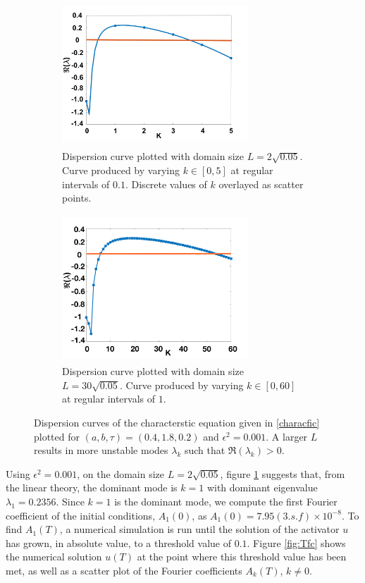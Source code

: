 \begin{figure}[H]
    \centering
    \begin{subfigure}[b]{0.45\textwidth}
        \centering
        \includegraphics[width=7cm,height=5.5cm]{compdisp1.png}
        \caption{Dispersion curve plotted with domain size $L=2\sqrt{0.05}$. Curve produced by varying $k\in[0,5]$ at regular intervals of $0.1$. Discrete values of $k$ overlayed as scatter points. }
        \label{fig:compdisp1}
    \end{subfigure}
    \hfill
    \begin{subfigure}[b]{0.45\textwidth}
        \centering
        \includegraphics[width=7cm,height=5.5cm]{compdisp2.png}
        \caption{Dispersion curve plotted with domain size $L=30\sqrt{0.05}$. Curve produced by varying $k\in[0,60]$ at regular intervals of $1$.}
        \label{fig:compdisp2}
    \end{subfigure}
    \caption{Dispersion curves of the characterstic equation given in \eqref{characfic} plotted for $(a,b,\tau)=(0.4,1.8,0.2)$ and $\epsilon^2=0.001$. A larger $L$ results in more unstable modes $\lambda_k$ such that $\Re(\lambda_k)>0$. }
    \label{fig:compardisp}
\end{figure}
Using $\epsilon^2=0.001$, on the domain size $L=2\sqrt{0.05}$, figure \ref{fig:compdisp1} suggests that, from the linear theory, the dominant mode is $k=1$ with dominant eigenvalue $\lambda_1=0.2356$. Since $k=1$ is the dominant mode, we compute the first Fourier coefficient of the initial conditions, $A_1(0)$, as $A_1(0)=7.95(3.s.f)\times10^{-8}$. To find $A_1(T)$, a numerical simulation is run until the solution of the activator $u$ has grown, in absolute value, to a threshold value of $0.1$. Figure \ref{fig:Tfc} shows the numerical solution $u(T)$ at the point where this threshold value has been met, as well as a scatter plot of the Fourier coefficients $A_k(T)$, $k\neq0$.
